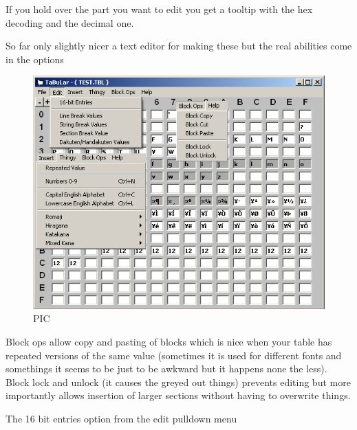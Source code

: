 \documentclass[
]{book}
\begin{document}
If you hold over the part you want to edit you get a tooltip with the hex decoding and the decimal one.

So far only slightly nicer a text editor for making these but the real abilities come in the options

\begin{figure}
\centering
\includegraphics{images/98_home_fast6191_romhackingguide_unrenamed_file___al_borders_romhackingguidertexttablemaking3.png}
\caption{PIC}
\end{figure}

Block ops allow copy and pasting of blocks which is nice when your table has repeated versions of the same value (sometimes it is used for different fonts and somethings it seems to be just to be awkward but it happens none the less). Block lock and unlock (it causes the greyed out things) prevents editing but more importantly allows insertion of larger sections without having to overwrite things.

The 16 bit entries option from the edit pulldown menu
\end{document}
